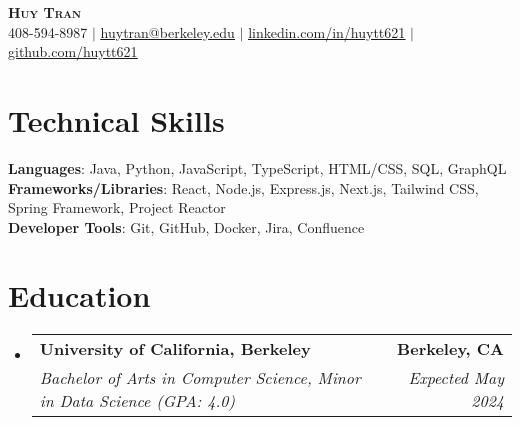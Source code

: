 \documentclass[letterpaper,11pt]{article}
\makeatletter
\newcommand{\resumeSubheading}[4]{
  \vspace{-2pt}\item
    \begin{tabular*}{0.97\textwidth}[t]{l@{\extracolsep{\fill}}r}
      \textbf{#1} & #2 \\
      \textit{\small#3} & \textit{\small #4} \\
    \end{tabular*}\vspace{-7pt}
}
\newcommand{\resumeSubHeadingListStart}{\begin{itemize}[leftmargin=0.15in, label={}]}
\newcommand{\resumeSubHeadingListEnd}{\end{itemize}}
\makeatother
\begin{document}

\begin{center}
    \textbf{\Huge \scshape Huy Tran} \\ \vspace{1pt}
    \small 408-594-8987 $|$ \href{mailto:huytran@berkeley.edu}{\underline{huytran@berkeley.edu}} $|$ 
    \href{https://linkedin.com/in/huytt621}{\underline{linkedin.com/in/huytt621}} $|$
    \href{https://github.com/huytt621}{\underline{github.com/huytt621}}
\end{center}


%
\section{\textbf{Technical Skills}}
 \begin{itemize}[leftmargin=0.15in, label={}]
    \small{\item{
     \textbf{Languages}{: Java, Python, JavaScript, TypeScript, HTML/CSS, SQL, GraphQL} \\
     \textbf{Frameworks/Libraries}{: React, Node.js, Express.js, Next.js, Tailwind CSS, Spring Framework, Project Reactor} \\
     \textbf{Developer Tools}{: Git, GitHub, Docker, Jira, Confluence}
    }}
 \end{itemize}


\section{\textbf{Education}}
  \resumeSubHeadingListStart
    \resumeSubheading
      {University of California, Berkeley}{\textbf{Berkeley, CA}}
      {Bachelor of Arts in Computer Science, Minor in Data Science (GPA: 4.0)}{Expected May 2024}

  \resumeSubHeadingListEnd
\end{document}
